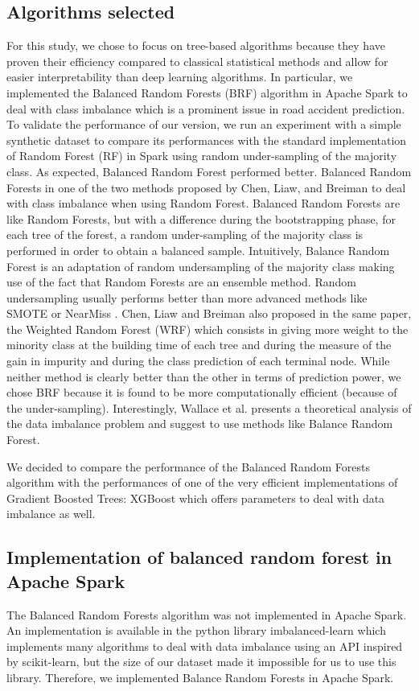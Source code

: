 \documentclass[conference]{IEEEtran}
\begin{document}
\subsection{Algorithms selected}
For this study, we chose to focus on tree-based algorithms because they have proven their efficiency compared to classical statistical methods and allow for easier interpretability than deep learning algorithms. In particular, we implemented the Balanced Random Forests (BRF) algorithm in Apache Spark to deal with class imbalance which is a prominent issue in road accident prediction. To validate the performance of our version, we run an experiment with a simple synthetic dataset to compare its performances with the standard implementation of Random Forest (RF) in Spark using random under-sampling of the majority class. As expected, Balanced Random Forest performed better. Balanced Random Forests in one of the two methods proposed by Chen, Liaw, and Breiman\cite{Chen2004} to deal with class imbalance when using Random Forest. Balanced Random Forests are like Random Forests, but with a difference during the bootstrapping phase, for each tree of the forest, a random under-sampling of the majority class is performed in order to obtain a balanced sample. Intuitively, Balance Random Forest is an adaptation of random undersampling of the majority class making use of the fact that Random Forests are an ensemble method. Random undersampling usually performs better than more advanced methods like SMOTE or NearMiss \cite{Branco2016}. Chen, Liaw and Breiman\cite{Chen2004} also proposed in the same paper, the Weighted Random Forest (WRF) which consists in giving more weight to the minority class at the building time of each tree and during the measure of the gain in impurity and during the class prediction of each terminal node. While neither method is clearly better than the other in terms of prediction power, we chose BRF because it is found to be more computationally efficient (because of the under-sampling). Interestingly, Wallace et al. \cite{Wallace2011} presents a theoretical analysis of the data imbalance problem and suggest to use methods like Balance Random Forest. 
	
We decided to compare the performance of the Balanced Random Forests algorithm with the performances of one of the very efficient implementations of Gradient Boosted Trees: XGBoost which offers parameters to deal with data imbalance as well.

\subsection{Implementation of balanced random forest in Apache Spark}
The Balanced Random Forests algorithm was not implemented in Apache Spark. An implementation is available in the python library imbalanced-learn\cite{imbalance} which implements many algorithms to deal with data imbalance using an API inspired by scikit-learn, but the size of our dataset made it impossible for us to use this library. Therefore, we implemented Balance Random Forests in Apache Spark. 
\end{document}
